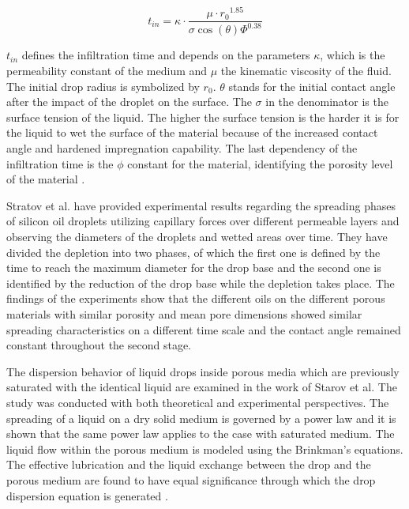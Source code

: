 \bigskip

\begin{equation}\label{eq:InfTime}
t_{in}=\kappa \cdotp {\frac{\mu \cdotp r{_0}^{1.85}}{\sigma \cos({\theta})\varPhi^{0.38}}}
\end{equation}

\bigskip

$t_{in}$ defines the infiltration time and depends on the parameters $\kappa$, which is the permeability constant of the medium and $\mu$ the kinematic viscosity of the fluid. The initial drop radius is symbolized by $r_{0}$. $\theta$ stands for the initial contact angle after the impact of the droplet on the surface. The $\sigma$ in the denominator is the surface tension of the liquid. The higher the surface tension is the harder it is for the liquid to wet the surface of the material because of the increased contact angle and hardened impregnation capability. The last dependency of the infiltration time is  the $\phi$ constant for the material, identifying the porosity level of the material \citep{markicevic2009infiltration}.

Stratov et al. have provided experimental results regarding  the spreading phases of silicon oil droplets utilizing capillary forces over different permeable layers and observing the diameters of the droplets and wetted areas over time. They have divided the depletion into two phases, of which the first one is defined by the time to reach the maximum diameter for the drop base and the second one is identified by the reduction of the drop base while the depletion takes place. The findings of the experiments show that the different oils on the different porous materials with similar porosity and mean pore dimensions showed similar spreading characteristics on a different time scale and the contact angle remained constant throughout the second stage\citep{starov2002thick}.

The dispersion behavior of liquid drops inside porous media which are previously saturated with the identical liquid are examined in the work of Starov et al. The study was conducted with both theoretical and experimental perspectives. The spreading of a liquid on a dry solid medium is governed by a power law and it is shown that the same power law applies to the case with saturated medium. The liquid flow within the porous medium is modeled using the Brinkman’s equations. The effective lubrication and the liquid exchange between the drop and the porous medium are found to have equal significance through which the drop dispersion equation is generated \citep{starov2002saturated}.

